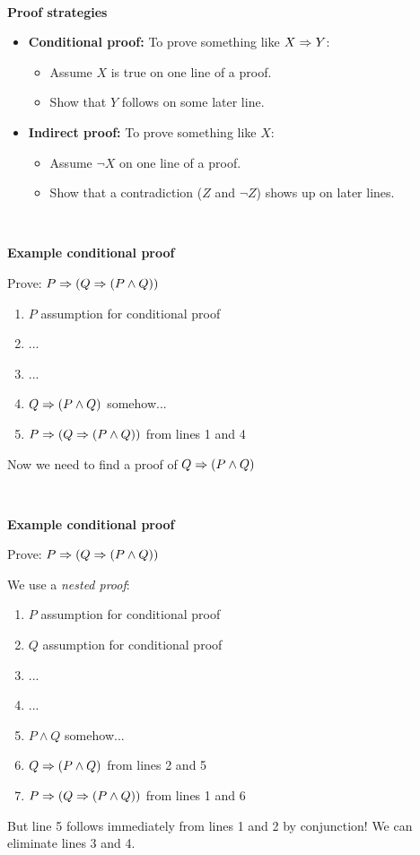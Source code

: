 \documentclass{article}
\newcommand{\bi}{\begin{itemize}}
\newcommand{\ii}{\item}
\newcommand{\ei}{\end{itemize}}
\newcommand{\ti}[1]{
\mbox{~}

\vspace{1.25in}
\centerline{\bf #1}}
\begin{document}
\newpage
\ti{Proof strategies}
\bi
\ii {\bf Conditional proof:} To prove something like $X\Rightarrow Y$:
\bi
\ii Assume $X$ is true on one line of a proof.
\ii Show that $Y$ follows on some later line.
\ei
\ii {\bf Indirect proof:}  To prove something like $X$:
\bi
\ii Assume $\neg X$ on one line of a proof.
\ii Show that a contradiction ($Z$ and $\neg Z$) shows up on later
lines.
\ei
\ei

\newpage
\newcommand{\ind}{\hspace{1cm}}
\newcommand{\indd}{\hspace{2cm}}
\newcommand{\inddd}{\hspace{3cm}}
\newcommand{\indddd}{\hspace{4cm}}
\ti{Example conditional proof}
Prove: $P\Rightarrow (Q\Rightarrow(P\land Q))$

\begin{enumerate}
\item \ind $P$ \hfill assumption for conditional proof
\item \ind ...
\item \ind ...
\item \ind $Q\Rightarrow(P\land Q)$  \hfill somehow...
\item $P\Rightarrow (Q\Rightarrow(P\land Q))$ \hfill from lines 1 and 4 
\end{enumerate}

\vspace{1cm}
Now we need to find a proof of $Q\Rightarrow (P\land Q)$

\newpage
\ti{Example conditional proof}
Prove: $P\Rightarrow (Q\Rightarrow(P\land Q))$

We use a {\em   nested proof}:

\begin{enumerate}
\item \ind $P$ \hfill assumption for conditional proof
\item \ind \ind $Q$ \hfill assumption for conditional proof
\item \ind\ind ...
\item \ind\ind ...
\item \ind\ind $P\land Q$ \hfill somehow...
\item \ind $Q\Rightarrow(P\land Q)$ \hfill from lines 2 and 5
\item $P\Rightarrow (Q\Rightarrow(P\land Q))$ \hfill from lines 1 and 6
\end{enumerate}

\vspace{1cm}

But line 5 follows immediately from lines 1 and 2 by
conjunction!   We can eliminate lines 3 and 4.
\end{document}
